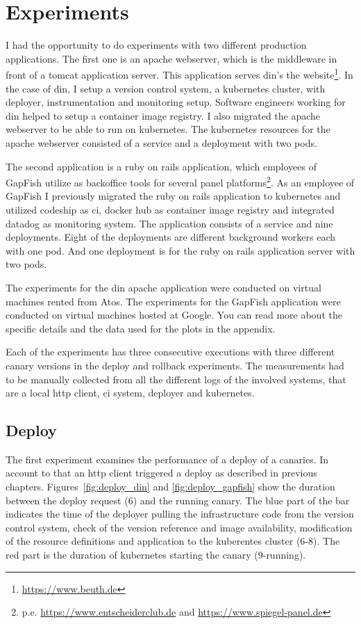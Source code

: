 \section{Experiments}

I had the opportunity to do experiments with two different production applications. The
first one is an apache webserver, which is the middleware in front of a tomcat application
server. This application serves \gls{din}'s the website\footnote{\url{https://www.beuth.de}}. In
the case of \gls{din}, I setup a version control system, a kubernetes cluster, with deployer,
instrumentation and monitoring setup. Software engineers working for \gls{din} helped to
setup a container image registry. I also migrated the apache webserver to be able to run
on kubernetes. The kubernetes resources for the apache webserver consisted of a service
and a deployment with two pods.

The second application is a ruby on rails application, which employees of GapFish utilize
as backoffice tools for several panel
platforms\footnote{p.e. \url{https://www.entscheiderclub.de} and
  \url{https://www.spiegel-panel.de}}. As an employee of GapFish I previously migrated the
ruby on rails application to kubernetes and utilized codeship as \gls{ci}, docker hub as
container image registry and integrated datadog as monitoring system. The application
consists of a service and nine deployments. Eight of the deployments are different
background workers each with one pod. And one deployment is for the ruby on rails
application server with two pods.

The experiments for the \gls{din} apache application were conducted on virtual machines rented
from Atos. The experiments for the GapFish application were conducted on virtual machines
hosted at Google. You can read more about the specific details and the data used for the
plots in the appendix.

Each of the experiments has three consecutive executions with three different canary
versions in the deploy and rollback experiments. The measurements had to be manually
collected from all the different logs of the involved systems, that are a local http
client, \gls{ci} system, deployer and kubernetes.

\subsection{Deploy}

The first experiment examines the performance of a deploy of a canaries. In account to
that an http client triggered a deploy as described in previous
chapters. Figures~\ref{fig:deploy_din} and \ref{fig:deploy_gapfish} show the duration
between the deploy request (6) and the running canary. The blue part of the bar indicates
the time of the deployer pulling the infrastructure code from the version control system,
check of the version reference and image availability, modification of the resource
definitions and application to the kuberentes cluster (6-8). The red part is the duration
of kubernetes starting the canary (9-running).

